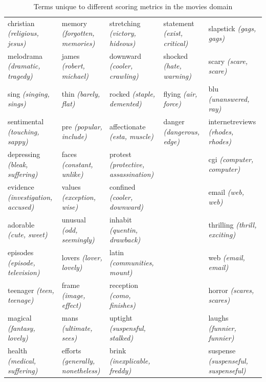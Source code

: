 {\begin{landscape}
\begin{table}[]
\begin{tabular}{lllll}
			christian \textit{(religious, jesus)}      & memory \textit{(forgotten, memories)}     & stretching \textit{(victory, hideous)}           & statement \textit{(exist, critical)}        & slapstick \textit{(gags, gags)}               \\
			melodrama \textit{(dramatic, tragedy)}     & james \textit{(robert, michael)}          & downward \textit{(cooler, crawling)}             & shocked \textit{(hate, warning)}            & scary \textit{(scare, scare)}                 \\
			sing \textit{(singing, sings)}             & thin \textit{(barely, flat)}              & rocked \textit{(staple, demented)}               & flying \textit{(air, force)}                & blu \textit{(unanswered, ray)}                \\
			sentimental \textit{(touching, sappy)}     & pre \textit{(popular, include)}           & affectionate \textit{(esta, muscle)}             & danger \textit{(dangerous, edge)}           & internetreviews \textit{(rhodes, rhodes)}     \\
			depressing \textit{(bleak, suffering)}     & faces \textit{(constant, unlike)}         & protest \textit{(protective, assassination)}     &                                    & cgi \textit{(computer, computer)}             \\
			evidence \textit{(investigation, accused)} & values \textit{(exception, wise)}         & confined \textit{(cooler, downward)}             &                                    & email \textit{(web, web)}                     \\
			adorable \textit{(cute, sweet)}            & unusual \textit{(odd, seemingly)}         & inhabit \textit{(quentin, drawback)}             &                                    & thrilling \textit{(thrill, exciting)}         \\
			episodes \textit{(episode, television)}    & lovers \textit{(lover, lovely)}           & latin \textit{(communities, mount)}              &                                    & web \textit{(email, email)}                   \\
			teenager \textit{(teen, teenage)}          & frame \textit{(image, effect)}            & reception \textit{(como, finishes)}              &                                    & horror \textit{(scares, scares)}              \\
			magical \textit{(fantasy, lovely)}         & mans \textit{(ultimate, sees)}            & uptight \textit{(suspensful, stalked)}           &                                    & laughs \textit{(funnier, funnier)}            \\
			health \textit{(medical, suffering)}       & efforts \textit{(generally, nonetheless)} & brink \textit{(inexplicable, freddy)}            &                                    & suspense \textit{(suspenseful, suspenseful)} 
		\end{tabular}
		\caption{Terms unique  to different scoring metrics in the movies domain}\label{ch3:scoringtypes}
	\end{table}
\end{landscape}
}
